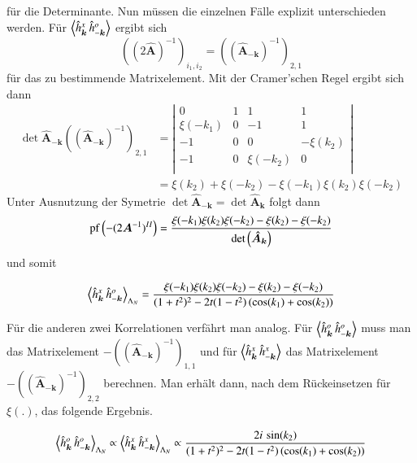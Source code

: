für die Determinante.
Nun müssen die einzelnen Fälle explizit unterschieden werden. Für $\left\langle \hat{h}_{\bm{k}}^x\, \hat{h}_{-\bm{k}}^o \right\rangle $ ergibt sich 
\begin{equation} \nonumber
((2\bm{\hat{A}})^{-1})_{i_1,i_2} = ((\bm{\hat{A}}_{-\bm{k}})^{-1})_{2,1}
\end{equation}
für das zu bestimmende Matrixelement. Mit der Cramer'schen Regel ergibt sich dann
\begin{align}
\det{\bm{\hat{A}}_{-\bm{k}}} ((\bm{\hat{A}}_{-\bm{k}})^{-1})_{2,1}  &= 
\left\vert \begin{array}{cccc} 
 0          & 1    &  1             & 1                   \\
 \xi(-k_1)  & 0    &  -1            &  1                   \\ 
-1          & 0    &  0             & -\xi(k_2)             \\ 
-1          & 0    &  \xi(-k_2)      &  0                   \\ 
    \end{array}
\right\vert \nonumber\\
& = \xi(k_2) + \xi(-k_2) - \xi(-k_1)\xi(k_2)\xi(-k_2)  \nonumber   
\end{align}
Unter Ausnutzung der Symetrie $\det{\bm{\hat{A}}_{-\bm{k}}} = \det{\bm{\hat{A}}_{\bm{k}}} $ folgt dann
\begin{align} \nonumber
\mathrm{pf}\left( -(2\bm{A}^{-1})^{II} \right) = \frac{\xi(-k_1)\xi(k_2)\xi(-k_2) -\xi(k_2) - \xi(-k_2) }{ \mathrm{det}\left( \bm{\hat{A}}_{\bm{k}} \right)}  
\end{align}
und somit 
\begin{grayframe}[frametitle = {Horizontale Graßmann-Paar-Korrelation im K-Raum}]
\begin{equation} \label{eq: expl grassmann_pair_corr}
\left\langle \hat{h}_{\bm{k}}^x\, \hat{h}_{-\bm{k}}^o \right\rangle_{\Lambda_N} = \frac{\xi(-k_1)\xi(k_2)\xi(-k_2) -\xi(k_2) - \xi(-k_2)}{(1+t^2)^2 - 2t(1-t^2)\,(\cos(k_1) + \cos(k_2))}
\end{equation}
\end{grayframe}
\noindent Für die anderen zwei Korrelationen verfährt man analog. Für $\left\langle \hat{h}_{\bm{k}}^o\, \hat{h}_{-\bm{k}}^o \right\rangle $ muss man das Matrixelement $-((\bm{\hat{A}}_{-\bm{k}})^{-1})_{1,1}$ und für  $\left\langle \hat{h}_{\bm{k}}^x\, \hat{h}_{-\bm{k}}^x \right\rangle $ das Matrixelement $-((\bm{\hat{A}}_{-\bm{k}})^{-1})_{2,2}$ berechnen. Man erhält dann, nach dem Rückeinsetzen für $\xi(.)$, das folgende Ergebnis.
\begin{grayframe}
\begin{equation} \label{eq: expl grassmann_pair_corr 0}
\left\langle \hat{h}_{\bm{k}}^o\, \hat{h}_{-\bm{k}}^o \right\rangle_{\Lambda_N} \propto \left\langle \hat{h}_{\bm{k}}^x\, \hat{h}_{-\bm{k}}^x \right\rangle_{\Lambda_N} \propto \frac{2i\,\sin(k_2)}{(1+t^2)^2 - 2t(1-t^2)\,(\cos(k_1) + \cos(k_2))} 
\end{equation}
\end{grayframe}



